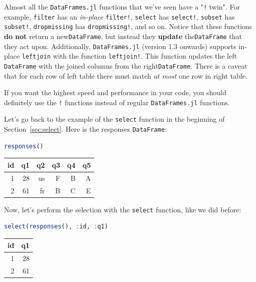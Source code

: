 \documentclass[
  notoc %
]{tufte-book}
\newcommand{\passthrough}[1]{#1}
\begin{document}
Almost all the \passthrough{\lstinline!DataFrames.jl!} functions that
we've seen have a "\passthrough{\lstinline"!"} twin". For example,
\passthrough{\lstinline!filter!} has an \emph{in-place}
\passthrough{\lstinline"filter!"}, \passthrough{\lstinline!select!} has
\passthrough{\lstinline"select!"}, \passthrough{\lstinline!subset!} has
\passthrough{\lstinline"subset!"}, \passthrough{\lstinline!dropmissing!}
has \passthrough{\lstinline"dropmissing!"}, and so on. Notice that these
functions \textbf{do not} return a
new\passthrough{\lstinline!DataFrame!}, but instead they \textbf{update}
the\passthrough{\lstinline!DataFrame!} that they act upon. Additionally,
\passthrough{\lstinline!DataFrames.jl!} (version 1.3 onwards) supports
in-place \passthrough{\lstinline!leftjoin!} with the function
\passthrough{\lstinline"leftjoin!"}. This function updates the left
\passthrough{\lstinline!DataFrame!} with the joined columns from the
right\passthrough{\lstinline!DataFrame!}. There is a caveat that for
each row of left table there must match \emph{at most} one row in right
table.

If you want the highest speed and performance in your code, you should
definitely use the \passthrough{\lstinline"!"} functions instead of
regular \passthrough{\lstinline!DataFrames.jl!} functions.

Let's go back to the example of the \passthrough{\lstinline!select!}
function in the beginning of Section~\ref{sec:select}. Here is the
responses \passthrough{\lstinline!DataFrame!}:

\begin{lstlisting}[language=Julia]
responses()
\end{lstlisting}

\begin{longtable}[]{@{}rrrrrr@{}}
\toprule()
id & q1 & q2 & q3 & q4 & q5 \\
\midrule()
\endhead
1 & 28 & us & F & B & A \\
2 & 61 & fr & B & C & E \\
\bottomrule()
\end{longtable}

Now, let's perform the selection with the
\passthrough{\lstinline!select!} function, like we did before:

\begin{lstlisting}[language=Julia]
select(responses(), :id, :q1)
\end{lstlisting}

\begin{longtable}[]{@{}rr@{}}
\toprule()
id & q1 \\
\midrule()
\endhead
1 & 28 \\
2 & 61 \\
\bottomrule()
\end{longtable}
\end{document}
